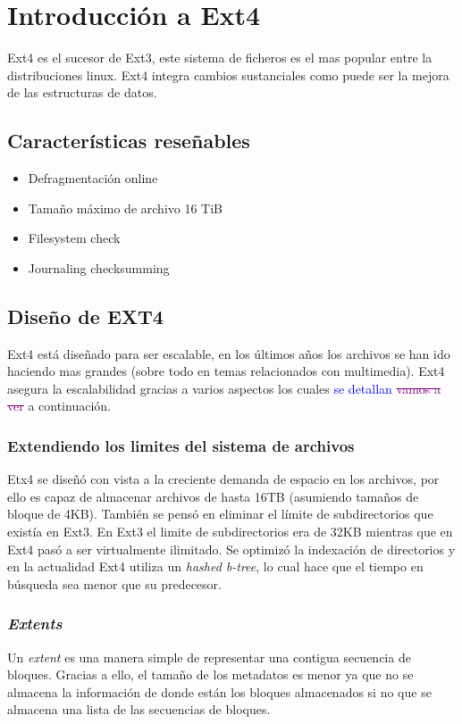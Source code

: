 \section{Introducción a Ext4}
Ext4 es el sucesor de Ext3, este sistema de ficheros es el mas popular entre la distribuciones linux. Ext4 integra cambios sustanciales como puede ser la mejora de las estructuras de datos.

\subsection{Características reseñables}
\begin{itemize}
    \item Defragmentación online
    \item Tamaño máximo de archivo 16 TiB
    \item Filesystem check
    \item Journaling checksumming
\end{itemize}


\subsection{Diseño de EXT4}
Ext4 está diseñado para ser escalable, en los últimos años los archivos se han ido haciendo mas grandes (sobre todo en temas relacionados con multimedia). Ext4 asegura la escalabilidad gracias a varios aspectos los cuales \textcolor{blue}{se detallan} \textcolor{purple}{\sout{
vamos a ver}} a continuación.\\

\subsubsection{Extendiendo los limites del sistema de archivos}
Etx4 se diseñó con vista a la creciente demanda de espacio en los archivos, por ello es capaz de almacenar archivos de hasta 16TB (asumiendo tamaños de bloque de 4KB). También se pensó en eliminar el límite de subdirectorios que existía en Ext3. En Ext3 el limite de subdirectorios era de 32KB mientras que en Ext4 pasó a ser virtualmente ilimitado. Se optimizó la indexación de directorios y en la actualidad Ext4 utiliza un \textit{hashed b-tree}, lo cual hace que el tiempo en búsqueda sea menor que su predecesor. \cite{jones_2009}

\subsubsection{\textit{Extents}}
Un \textit{extent} es una manera simple de representar una contigua secuencia de bloques. Gracias a ello, el tamaño de los metadatos es menor ya que no se almacena la información de donde están los bloques almacenados si no que se almacena una lista de las secuencias de bloques.\\

